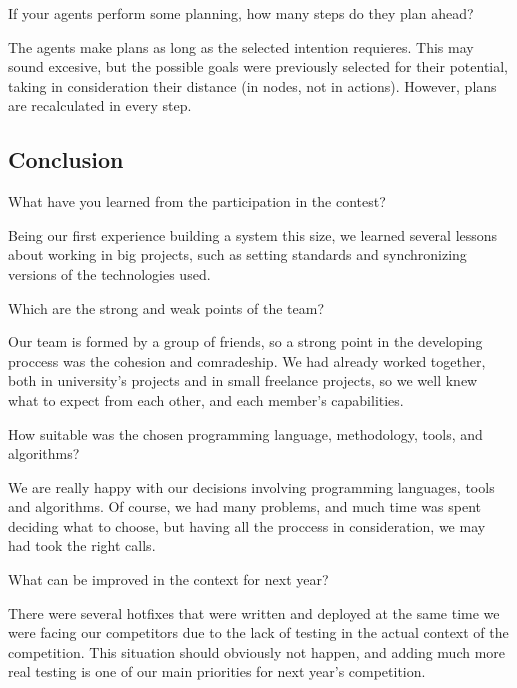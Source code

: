 \begin{question}
If your agents perform some planning, how many steps do they plan ahead?
\end{question}

The agents make plans as long as the selected intention requieres. This may
sound excesive, but the possible goals were previously selected for their
potential, taking in consideration their distance (in nodes, not in actions).
However, plans are recalculated in every step.

\subsection{Conclusion}
\setcounter{question}{0}
\begin{question}
What have you learned from the participation in the contest?
\end{question}

Being our first experience building a system this size, we learned several 
lessons about working in big projects, such as setting standards and 
synchronizing versions of the technologies used.

\begin{question}
Which are the strong and weak points of the team?
\end{question}

    Our team is formed by a group of friends, so a strong point in the
    developing proccess was the cohesion and comradeship. We had
    already worked together, both in university's projects and in
    small freelance projects, so we well knew what to expect from each other,
    and each member's capabilities.

\begin{question}  
How suitable was the chosen programming language, methodology, tools, and
algorithms?
\end{question}

    We are really happy with our decisions involving programming languages,
    tools and algorithms. Of course, we had many problems, and much time was
    spent deciding what to choose, but having all the proccess in
    consideration, we may had took the right calls.

\begin{question}
What can be improved in the context for next year?
\end{question}

There were several hotfixes that were written and deployed at the same 
time we were facing our competitors due to the lack of testing in the 
actual context of the competition. This situation should obviously not 
happen, and adding much more real testing is one of our main priorities 
for next year's competition.

